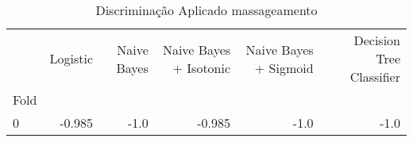 \begin{table}
\centering
\caption{Discriminação Aplicado massageamento}
\label{Discriminação Aplicado massageamento 7}
\begin{tabular}{lrrrrr}
\toprule
{} &  Logistic &  Naive Bayes &  Naive Bayes + Isotonic &  Naive Bayes + Sigmoid &  Decision Tree Classifier \\
Fold &           &              &                         &                        &                           \\
\midrule
0    &    -0.985 &         -1.0 &                  -0.985 &                   -1.0 &                      -1.0 \\
\bottomrule
\end{tabular}
\end{table}
